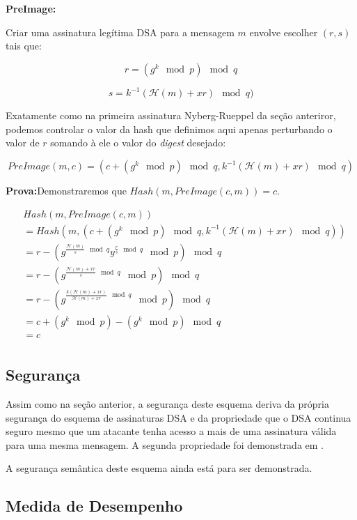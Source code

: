 \documentclass[a4paper]{article}
\begin{document}
 \textbf{PreImage:}
 
 Criar uma assinatura legítima DSA para a mensagem $m$ envolve escolher
 $(r, s)$ tais que:
 
 $$
 r = (g^k \mod p) \mod q
 $$
 
 $$
 s = k^{-1}(\mathcal{H}(m)+xr) \mod q)
 $$
 
 Exatamente como na primeira assinatura Nyberg-Rueppel da seção
 anteriror, podemos controlar o valor da hash que definimos aqui apenas
 perturbando o valor de $r$ somando à ele o valor do \textit{digest}
 desejado:
 
 $$
 PreImage(m, c) = (c + (g^k \mod p) \mod q,k^{-1}(\mathcal{H}(m)+xr) \mod q)
 $$
 
 \textbf{Prova:}Demonstraremos que $Hash(m, PreImage(c, m)) = c$.
 
 \begin{equation*}
 \begin{split}
 &Hash(m, PreImage(c, m))\\
 &= Hash(m, (c + (g^k \mod p) \mod q, k^{-1}(\mathcal{H}(m)+xr) \mod q))\\
 &= r - (g^{\frac{\mathcal{H}(m)}{s} \mod q}y^{\frac{r}{s} \mod q} \mod p) \mod q\\
 &= r - (g^{\frac{\mathcal{H}(m)+xr}{s} \mod q} \mod p) \mod q\\
 &= r - (g^{\frac{k(\mathcal{H}(m)+xr)}{\mathcal{H}(m)+xr} \mod q} \mod p) \mod q\\
 &= c + (g^k \mod p) - (g^{k} \mod p) \mod q\\
 &= c\\
 \end{split}
 \end{equation*}
 
 \subsection{Segurança}
 
 Assim como na seção anterior, a segurança deste esquema deriva da
 própria segurança do esquema de assinaturas DSA e da propriedade que o
 DSA continua seguro mesmo que um atacante tenha acesso a mais de uma
 assinatura válida para uma mesma mensagem. A segunda propriedade foi
 demonstrada em \cite{twin}.
 
 A segurança semântica deste esquema ainda está para ser demonstrada.
 
 \subsection{Medida de Desempenho}
 
\end{document}
